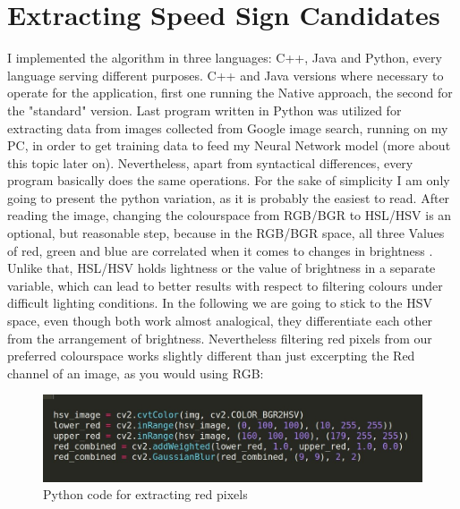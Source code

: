 \section{Extracting Speed Sign Candidates}
I implemented the algorithm in three languages: C++, Java and Python, every language serving different purposes. C++ and Java versions where necessary to operate for the application, first one running the Native approach, the second for the "standard" version. Last program written in Python was utilized for extracting data from images collected from Google image search, running on my PC, in order to get training data to feed my Neural Network model (more about this topic later on). Nevertheless, apart from syntactical differences, every program basically does the same operations. For the sake of simplicity I am only going to present the python variation, as it is probably the easiest to read.\newline
After reading the image, changing the colourspace from RGB/BGR to HSL/HSV is an optional, but reasonable step, because in the RGB/BGR space, all three Values of red, green and blue are correlated when it comes to changes in brightness \cite{imagesegmentation}. Unlike that, HSL/HSV holds lightness or the value of brightness in a separate variable, which can lead to better results with respect to filtering colours under difficult lighting conditions. In the following we are going to stick to the HSV space, even though both work almost analogical, they differentiate each other from the arrangement of brightness. \newline
Nevertheless filtering red pixels from our preferred colourspace works slightly different than just excerpting the Red channel of an image, as you would using RGB:
\begin{figure}[H]
	\minipage{\textwidth}
	\includegraphics[width=\linewidth]{images/filterredimage.jpg}
	\caption{Python code for extracting red pixels}\label{fig:pythonredpix}
	\endminipage\hfill
\end{figure}

